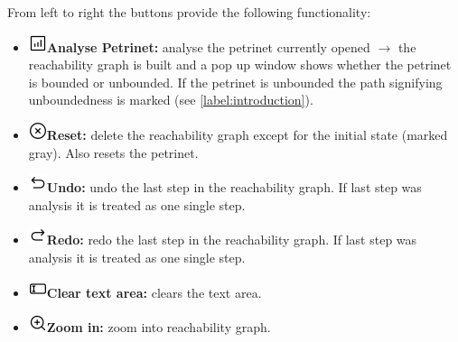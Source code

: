 \documentclass[10pt, a4paper]{article}
\begin{document}
From left to right the buttons provide the following functionality:
\begin{itemize}
\item\includegraphics[scale=0.4]{../../src/resources/images/Toolbar/stats.png}\hspace{0.1cm}\textbf{Analyse Petrinet:} analyse the petrinet currently opened $\rightarrow$ the reachability graph is built and a pop up window shows whether the petrinet is bounded or unbounded. If the petrinet is unbounded the path signifying unboundedness is marked (see \ref{label:introduction}). 
\item\includegraphics[scale=0.4]{../../src/resources/images/Toolbar/delete.png}\hspace{0.1cm}\textbf{Reset:} delete the reachability graph except for the initial state (marked gray). Also resets the petrinet. 
\item\includegraphics[scale=0.4]{../../src/resources/images/Toolbar/undo.png}\hspace{0.1cm}\textbf{Undo:} undo the last step in the reachability graph. If last step was analysis it is treated as one single step.
\item\includegraphics[scale=0.4]{../../src/resources/images/Toolbar/redo.png}\hspace{0.1cm}\textbf{Redo:} redo the last step in the reachability graph. If last step was analysis it is treated as one single step.
\item\includegraphics[scale=0.4]{../../src/resources/images/Toolbar/input.png}\hspace{0.1cm}\textbf{Clear text area:} clears the text area.
\item\includegraphics[scale=0.4]{../../src/resources/images/Toolbar/zoom-in.png}\hspace{0.1cm}\textbf{Zoom in:} zoom into reachability graph.

\end{itemize}
\end{document}
